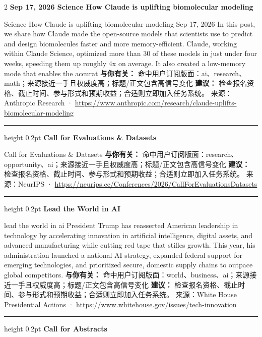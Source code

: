 \documentclass[10.5pt]{ctexart}
\begin{document}
\begin{multicols}{2}
{\large\bfseries Sep 17, 2026 Science How Claude is uplifting biomolecular modeling}\par
Science How Claude is uplifting biomolecular modeling Sep 17, 2026 In this post, we share how Claude made the open-source models that scientists use to predict and design biomolecules faster and more memory-efficient. Claude, working within Claude Science, optimized more than 30 of these models in just under four weeks, speeding them up roughly 4x on average. It also created a low-memory mode that enables the accurat
\textbf{与你有关：} 命中用户订阅版面：ai、research、math；来源接近一手且权威度高；标题/正文包含高信号变化
\textbf{建议：} 检查报名资格、截止时间、参与形式和预期收益；合适则立即加入任务系统。
{\footnotesize\color{ormuted} 来源：Anthropic Research · \url{https://www.anthropic.com/research/claude-uplifts-biomolecular-modeling}}
\vspace{2mm}
\hrule height 0.2pt
\vspace{2mm}
{\large\bfseries Call for Evaluations \& Datasets}\par
Call for Evaluations \& Datasets
\textbf{与你有关：} 命中用户订阅版面：research、opportunity、ai；来源接近一手且权威度高；标题/正文包含高信号变化
\textbf{建议：} 检查报名资格、截止时间、参与形式和预期收益；合适则立即加入任务系统。
{\footnotesize\color{ormuted} 来源：NeurIPS · \url{https://neurips.cc/Conferences/2026/CallForEvaluationsDatasets}}
\vspace{2mm}
\hrule height 0.2pt
\vspace{2mm}
{\large\bfseries Lead the World in AI}\par
lead the world in ai President Trump has reasserted American leadership in technology by accelerating innovation in artificial intelligence, digital assets, and advanced manufacturing while cutting red tape that stifles growth. This year, his administration launched a national AI strategy, expanded federal support for emerging technologies, and prioritized secure, domestic supply chains to outpace global competitors.
\textbf{与你有关：} 命中用户订阅版面：world、business、ai；来源接近一手且权威度高；标题/正文包含高信号变化
\textbf{建议：} 检查报名资格、截止时间、参与形式和预期收益；合适则立即加入任务系统。
{\footnotesize\color{ormuted} 来源：White House Presidential Actions · \url{https://www.whitehouse.gov/issues/tech-innovation}}
\vspace{2mm}
\hrule height 0.2pt
\vspace{2mm}
{\large\bfseries Call for Abstracts}\par

\end{multicols}
\end{document}
